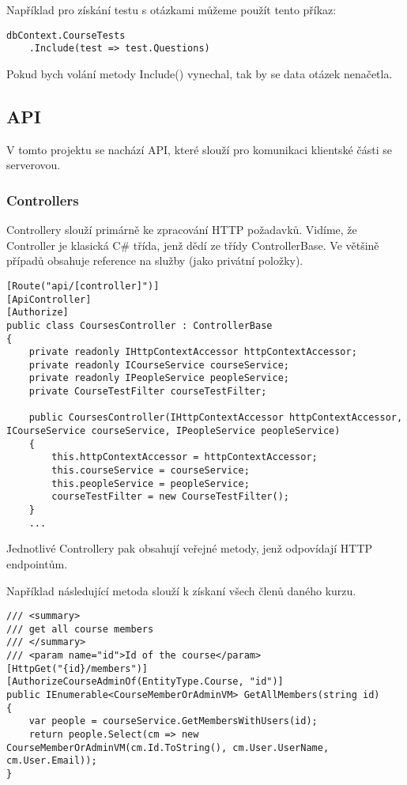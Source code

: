 Například pro získání testu s otázkami můžeme použít tento příkaz:
\begin{lstlisting}
dbContext.CourseTests
	.Include(test => test.Questions)
\end{lstlisting}
Pokud bych volání metody Include() vynechal, tak by se data otázek nenačetla.

\newpage

\subsection{API}
V tomto projektu se nachází API, které slouží pro komunikaci klientské části se serverovou.

\subsubsection*{Controllers}
Controllery slouží primárně ke zpracování HTTP požadavků. Vidíme, že Controller je klasická C\# třída, jenž dědí ze třídy ControllerBase. Ve většině případů obsahuje reference na služby (jako privátní položky).

\begin{lstlisting}
[Route("api/[controller]")]
[ApiController]
[Authorize]
public class CoursesController : ControllerBase
{
	private readonly IHttpContextAccessor httpContextAccessor;
	private readonly ICourseService courseService;
	private readonly IPeopleService peopleService;
	private CourseTestFilter courseTestFilter;
	
	public CoursesController(IHttpContextAccessor httpContextAccessor, ICourseService courseService, IPeopleService peopleService)
	{
		this.httpContextAccessor = httpContextAccessor;
		this.courseService = courseService;
		this.peopleService = peopleService;
		courseTestFilter = new CourseTestFilter();
	}
	...
\end{lstlisting}

Jednotlivé Controllery pak obsahují veřejné metody, jenž odpovídají HTTP endpointům.

Například následující metoda slouží k získaní všech členů daného kurzu.
\begin{lstlisting}
/// <summary>
/// get all course members
/// </summary>
/// <param name="id">Id of the course</param>
[HttpGet("{id}/members")]
[AuthorizeCourseAdminOf(EntityType.Course, "id")]
public IEnumerable<CourseMemberOrAdminVM> GetAllMembers(string id)
{
	var people = courseService.GetMembersWithUsers(id);
	return people.Select(cm => new CourseMemberOrAdminVM(cm.Id.ToString(), cm.User.UserName, cm.User.Email));
}
\end{lstlisting}

